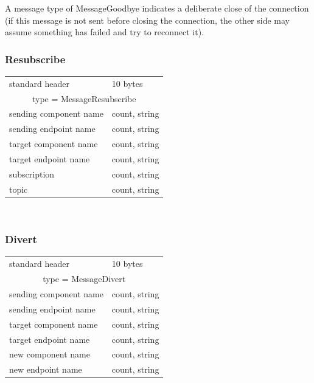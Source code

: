 \documentclass[12pt,a4paper,twoside]{article}
\renewcommand{\_}{\texttt{\symbol{95}}}
\begin{document}
A message type of MessageGoodbye indicates a deliberate close of the connection
(if this message is not sent before closing the connection, the other
side may assume something has failed and try to reconnect it).

\subsubsection{Resubscribe}

\begin{tabular}{|ll|}
\hline
standard header    & 10 bytes\\
\multicolumn{2}{|c|}{type = MessageResubscribe}\\
\hline
sending component name  & count, string\\
sending endpoint name   & count, string\\
target component name   & count, string\\
target endpoint name    & count, string\\
subscription       & count, string\\
topic              & count, string\\
\hline
\end{tabular}\\

\subsubsection{Divert}

\begin{tabular}{|ll|}
\hline
standard header    & 10 bytes\\
\multicolumn{2}{|c|}{type = MessageDivert}\\
\hline
sending component name  & count, string\\
sending endpoint name   & count, string\\
target component name   & count, string\\
target endpoint name    & count, string\\
new component name      & count, string\\
new endpoint name       & count, string\\
\hline
\end{tabular}\\
\end{document}
